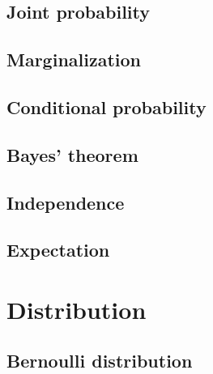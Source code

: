 \documentclass[12pt,oneside,openany]{book}
\begin{document}
\section{Joint probability}
\section{Marginalization}
\section{Conditional probability}
\section{Bayes' theorem}
\section{Independence}
\section{Expectation}

\chapter{Distribution}
\section{Bernoulli distribution}
\end{document}
